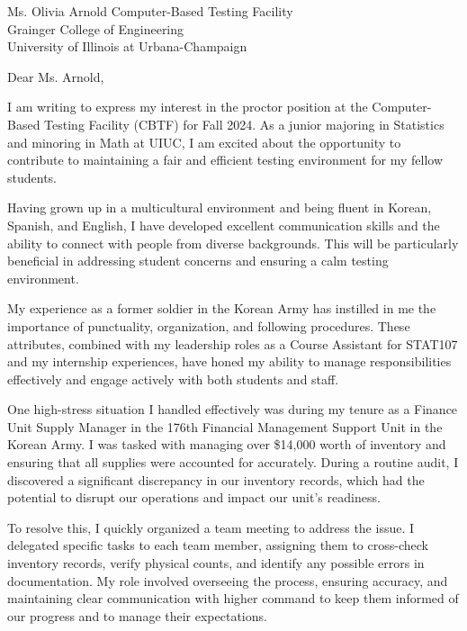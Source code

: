 \documentclass{letter}
\begin{document}
\begin{letter}{Ms. Olivia Arnold
    Computer-Based Testing Facility\\
    Grainger College of Engineering\\
    University of Illinois at Urbana-Champaign
}


\opening{Dear Ms. Arnold,}

I am writing to express my interest in the proctor position at the Computer-Based Testing Facility (CBTF) for Fall 2024. As a junior majoring in Statistics and minoring in Math at UIUC, I am excited about the opportunity to contribute to maintaining a fair and efficient testing environment for my fellow students.

Having grown up in a multicultural environment and being fluent in Korean, Spanish, and English, I have developed excellent communication skills and the ability to connect with people from diverse backgrounds. This will be particularly beneficial in addressing student concerns and ensuring a calm testing environment.

My experience as a former soldier in the Korean Army has instilled in me the importance of punctuality, organization, and following procedures. These attributes, combined with my leadership roles as a Course Assistant for STAT107 and my internship experiences, have honed my ability to manage responsibilities effectively and engage actively with both students and staff.

One high-stress situation I handled effectively was during my tenure as a Finance Unit Supply Manager in the 176th Financial Management Support Unit in the Korean Army. I was tasked with managing over \$14,000 worth of inventory and ensuring that all supplies were accounted for accurately. During a routine audit, I discovered a significant discrepancy in our inventory records, which had the potential to disrupt our operations and impact our unit’s readiness.

To resolve this, I quickly organized a team meeting to address the issue. I delegated specific tasks to each team member, assigning them to cross-check inventory records, verify physical counts, and identify any possible errors in documentation. My role involved overseeing the process, ensuring accuracy, and maintaining clear communication with higher command to keep them informed of our progress and to manage their expectations.


\end{letter}
\end{document}
